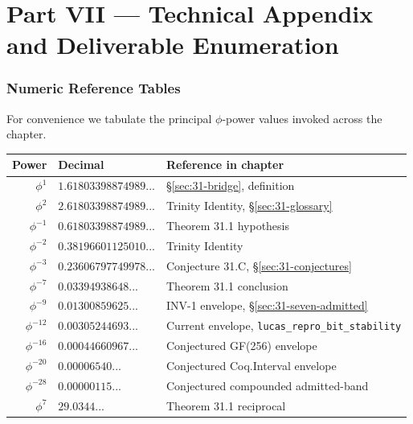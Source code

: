 
\part*{Part VII — Technical Appendix and Deliverable Enumeration}

\section{Numeric Reference Tables}
\label{sec:31-numeric-tables}

For convenience we tabulate the principal $\phi$-power values invoked across the chapter.

\begin{center}
\begin{tabular}{|r|l|l|}
\hline
\textbf{Power} & \textbf{Decimal} & \textbf{Reference in chapter} \\
\hline
$\phi^{1}$ & $1.61803398874989...$ & §\ref{sec:31-bridge}, definition \\
$\phi^{2}$ & $2.61803398874989...$ & Trinity Identity, §\ref{sec:31-glossary} \\
$\phi^{-1}$ & $0.61803398874989...$ & Theorem 31.1 hypothesis \\
$\phi^{-2}$ & $0.38196601125010...$ & Trinity Identity \\
$\phi^{-3}$ & $0.23606797749978...$ & Conjecture 31.C, §\ref{sec:31-conjectures} \\
$\phi^{-7}$ & $0.03394938648...$ & Theorem 31.1 conclusion \\
$\phi^{-9}$ & $0.01300859625...$ & INV-1 envelope, §\ref{sec:31-seven-admitted} \\
$\phi^{-12}$ & $0.00305244693...$ & Current envelope, \texttt{lucas\_repro\_bit\_stability} \\
$\phi^{-16}$ & $0.00044660967...$ & Conjectured GF(256) envelope \\
$\phi^{-20}$ & $0.00006540...$ & Conjectured Coq.Interval envelope \\
$\phi^{-28}$ & $0.00000115...$ & Conjectured compounded admitted-band \\
$\phi^{7}$ & $29.0344...$ & Theorem 31.1 reciprocal \\
\hline
\end{tabular}
\end{center}

